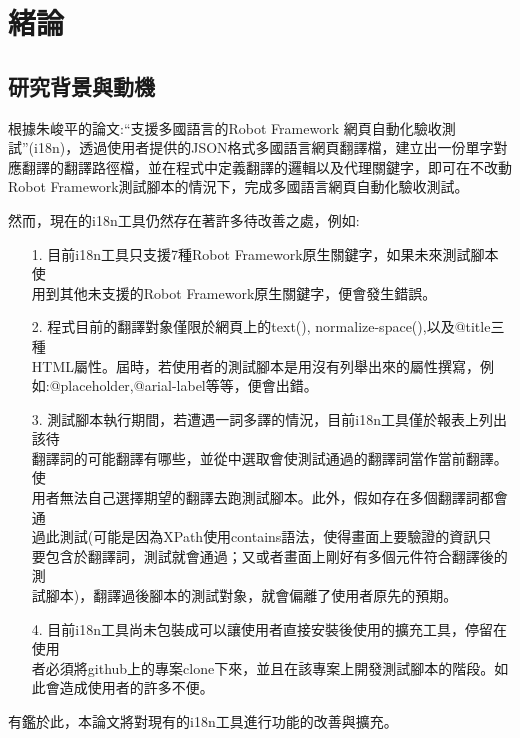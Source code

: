 \chapter{緒論}

\section{研究背景與動機}
根據朱峻平的論文:“支援多國語言的Robot Framework 網頁自動化驗收測試”(i18n)\cite{i18n}，透過使用者提供的JSON格式\cite{json}多國語言網頁翻譯檔，建立出一份單字對應翻譯的翻譯路徑檔，並在程式中定義翻譯的邏輯以及代理關鍵字，即可在不改動Robot Framework測試腳本的情況下，完成多國語言網頁自動化驗收測試。

然而，現在的i18n\cite{internationalization}工具仍然存在著許多待改善之處，例如: 

\begin{itemize}
\item[1.] 目前i18n工具只支援7種Robot Framework\cite{rf}原生關鍵字，如果未來測試腳本使\\
用到其他未支援的Robot Framework原生關鍵字，便會發生錯誤。
\item[2.] 程式目前的翻譯對象僅限於網頁上的text(), normalize-space(),以及@title三種\\
HTML屬性。屆時，若使用者的測試腳本是用沒有列舉出來的屬性撰寫，例\\
如:@placeholder,@arial-label等等，便會出錯。
\item[3.] 測試腳本執行期間，若遭遇一詞多譯的情況，目前i18n工具僅於報表上列出該待\\
翻譯詞的可能翻譯有哪些，並從中選取會使測試通過的翻譯詞當作當前翻譯。使\\
用者無法自己選擇期望的翻譯去跑測試腳本。此外，假如存在多個翻譯詞都會通\\
過此測試(可能是因為XPath\cite{xpath}\cite{stablexpath}使用contains語法，使得畫面上要驗證的資訊只\\
要包含於翻譯詞，測試就會通過；又或者畫面上剛好有多個元件符合翻譯後的測\\
試腳本)，翻譯過後腳本的測試對象，就會偏離了使用者原先的預期。
\item[4.] 目前i18n工具尚未包裝成可以讓使用者直接安裝後使用的擴充工具，停留在使用\\
者必須將github上的專案clone下來，並且在該專案上開發測試腳本的階段。如\\
此會造成使用者的許多不便。
\end{itemize}

有鑑於此，本論文將對現有的i18n工具進行功能的改善與擴充。

